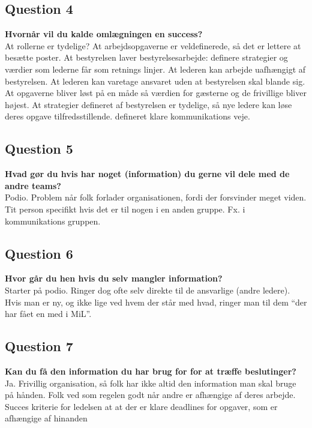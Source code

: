 \subsection{Question 4}
\label{i4q4}
\noindent \textbf{Hvornår vil du kalde omlægningen en success?} \\
At rollerne er tydelige? At arbejdsopgaverne er veldefinerede, så det er lettere at besætte poster. At bestyrelsen laver bestyrelsesarbejde: definere strategier og værdier som lederne får som retnings linjer. At lederen kan arbejde uafhængigt af bestyrelsen. At lederen kan varetage ansvaret uden at bestyrelsen skal blande sig. At opgaverne bliver løst på en måde så værdien for gæsterne og de frivillige bliver højest. At strategier defineret af bestyrelsen er tydelige, så nye ledere kan løse deres opgave tilfredsstillende. defineret klare kommunikations veje.

\subsection{Question 5}
\label{i4q5}
\noindent \textbf{Hvad gør du hvis har noget (information) du gerne vil dele med de andre teams?} \\
Podio. Problem når folk forlader organisationen, fordi der forsvinder meget viden. Tit person specifikt hvis det er til nogen i en anden gruppe. Fx. i kommunikations gruppen.

\subsection{Question 6}
\label{i4q6}
\noindent \textbf{Hvor går du hen hvis du selv mangler information?} \\
Starter på podio. Ringer dog ofte selv direkte til de ansvarlige (andre ledere). Hvis man er ny, og ikke lige ved hvem der står med hvad, ringer man til dem “der har fået en med i MiL”.


\subsection{Question 7}
\label{i4q7}
\noindent \textbf{Kan du få den information du har brug for for at træffe beslutinger?} \\
Ja. Frivillig organisation, så folk har ikke altid den information man skal bruge på hånden. Folk ved som regelen godt når andre er afhængige af deres arbejde. 
Succes kriterie for ledelsen at at der er klare deadlines for opgaver, som er afhængige af hinanden

